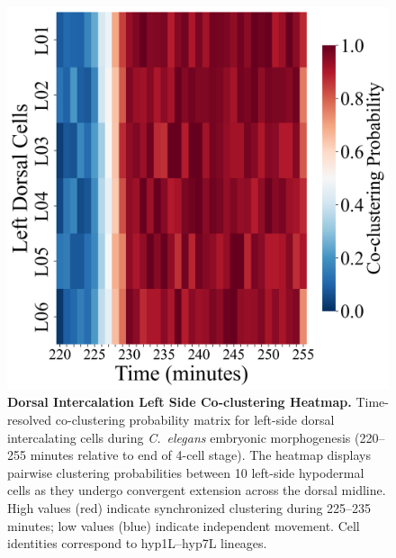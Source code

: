 \documentclass[unnumsec,webpdf,modern,large,namedate]{oup-authoring-template}%
\theoremstyle{thmstyleone}\newtheorem{theorem}{Theorem}
\theoremstyle{thmstyletwo}\newtheorem{example}{Example}
\theoremstyle{thmstylethree}\newtheorem{definition}{Definition}
\begin{document}
\begin{figure}[t]
  \centering
  \includegraphics[width=\linewidth]{Demo1A_Dorsal_Left_Coclustering_Heatmap.png}
  \caption{\textbf{Dorsal Intercalation Left Side Co-clustering Heatmap.} Time-resolved co-clustering probability matrix for left-side dorsal intercalating cells during \textit{C.~elegans} embryonic morphogenesis (220--255 minutes relative to end of 4-cell stage). The heatmap displays pairwise clustering probabilities between 10 left-side hypodermal cells as they undergo convergent extension across the dorsal midline. High values (red) indicate synchronized clustering during 225--235 minutes; low values (blue) indicate independent movement. Cell identities correspond to hyp1L--hyp7L lineages.}
  \label{fig:di_left}
\end{figure}
\end{document}
